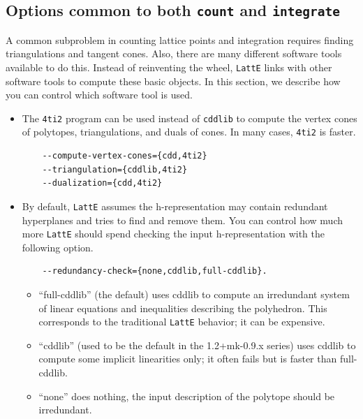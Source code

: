 \documentclass{article}
\newcommand{\latte}{{\tt LattE}\xspace}
\newcommand{\fourtitwo}{{\tt 4ti2}\xspace}
\begin{document}
\subsection{Options common to both {\tt count} and {\tt integrate}}

A common subproblem in counting lattice points and integration requires finding triangulations and tangent cones. Also, there are many different software tools available to do this. Instead of reinventing the wheel, \latte links with other software tools to compute these basic objects. In this section, we describe how you can control which software tool is used.

\begin{itemize}
\item The \fourtitwo program can be used instead of {\tt cddlib} 
  to compute the vertex cones of polytopes, triangulations, and duals of cones.
  In many cases, \fourtitwo is faster.
  
  \begin{verbatim}
	--compute-vertex-cones={cdd,4ti2}
	--triangulation={cddlib,4ti2}
	--dualization={cdd,4ti2}
  \end{verbatim}

\item By default, \latte assumes the h-representation may contain redundant hyperplanes and tries to find and remove them. You can control how much more \latte should spend checking the input h-representation with the following option.

	\begin{verbatim}
	--redundancy-check={none,cddlib,full-cddlib}.
	\end{verbatim}

	\begin{itemize}
  	\item ``full-cddlib'' (the default) uses cddlib to compute an irredundant
    system of linear equations and inequalities describing the
    polyhedron.  This corresponds to the traditional \latte behavior;
    it can be expensive.

	\item ``cddlib'' (used to be the default in the 1.2+mk-0.9.x series) uses
    cddlib to compute some implicit linearities only; it often fails
    but is faster than full-cddlib.

	\item ``none'' does nothing, the input description of the polytope should
    be irredundant.
		
	\end{itemize}

\end{itemize}
\end{document}
